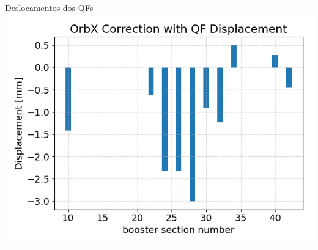 \documentclass[1610]{beamer}					  %
\begin{document}
\begin{frame}{Deslocamentos dos QFs}
\vspace{0.5cm}
\centering
    \includegraphics[scale=0.5]{2024-04-19/figures/qfs-displacements.png}
\end{frame}

\end{document}
